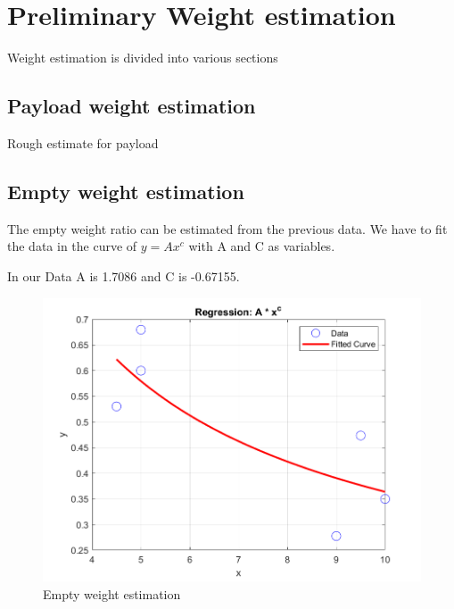 \documentclass[12 pt]{article}
\begin{document}
\newpage


\section{Preliminary Weight estimation}

Weight estimation is divided into various sections
\subsection{Payload weight estimation}
Rough estimate for payload
\begin{table}[h]
\centering
{}
\end{table}

\hfill


\subsection{Empty weight estimation}
The empty weight ratio can be estimated from the previous data. We have to fit the data in the curve of $y = A x^c$ with A and C as variables.

In our Data A is 1.7086 and C is -0.67155.

\begin{figure}[h]
    \centering
    \includegraphics[width = \linewidth]{Regression.png}
    \caption{Empty weight estimation}
    \label{fig:enter-label}
\end{figure}
\end{document}
